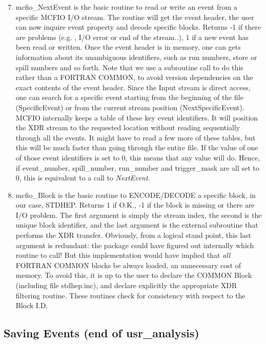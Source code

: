 \begin{enumerate}
\setcounter{enumi}{6}
\item  mcfio\_NextEvent is the basic routine to read or write an event from
a specific MCFIO I/O stream. The routine will get the event header, the user can
now  inquire event property and decode specific blocks. Returns -1 if there are
problems (e.g. , I/O error or end  of the stream..), 1 if a new event has been read or
written.  Once the event header is in memory, one can gets information  about
its unambiguous identifiers, such as run numbers, store or spill  numbers and
so forth. Note that we use a subroutine call to do this rather  than a FORTRAN
COMMON, to avoid version dependencies on the exact contents of the event
header.  Since the Input stream is direct access,  one can search for a
specific event starting from the beginning of the  file (SpecificEvent) or from
the current stream position  (NextSpecificEvent). MCFIO internally keeps
a table of these  key event identifiers. It will position the XDR  stream to
the requested location without reading  sequentially through all the events. It
might have  to read a few more of these tables, but this will  be much faster
than going through the entire file. If the value of one of those event
identifiers is set to 0, this means that any value will do. Hence, if
event\_number, spill\_number, run\_number and trigger\_mask are all set to
0, this is equivalent to a call to {\em NextEvent}.

\item mcfio\_Block is the basic routine to ENCODE/DECODE a
specific block, in our case, STDHEP. Returns 1 if O.K., -1 if the block is
missing or there are I/O problem. The first argument is simply the stream index,
the second is the unique block identifier, and the last argument is the
external subroutine that performs the XDR transfer. Obviously, from a
logical stand point, this last argument is redundant: the package could
have figured out internally which routine to call! But this implementation
would have implied that {\em all } FORTRAN COMMON blocks be always
loaded, an unnecessary cost of memory. To avoid this, it is up to the
user to declare the COMMON Block (including file stdhep.inc), and declare
explicitly the appropriate XDR filtering routine.  These routines
check for consistency with respect to the Block I.D.

\end{enumerate}

\subsection{Saving Events (end of usr\_analysis)}
\vspace{.1in}

